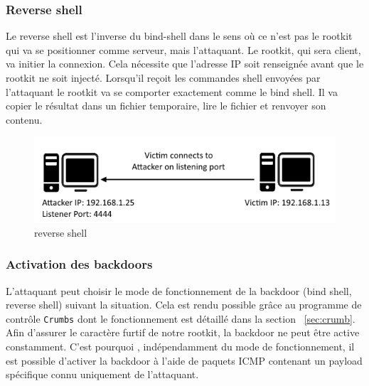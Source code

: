 \documentclass[12pt]{article}
\begin{document}
        \subsubsection{Reverse shell}
            
            Le reverse shell est l'inverse du bind-shell dans le sens où ce n'est pas le rootkit qui va se positionner comme serveur, mais l'attaquant. Le rootkit, qui sera client, va initier la connexion. Cela nécessite que l'adresse IP soit renseignée avant que le rootkit ne soit injecté. Lorsqu'il reçoit les commandes shell envoyées par l'attaquant le rootkit va se comporter exactement comme le bind shell. Il va copier le résultat dans un fichier temporaire, lire le fichier et renvoyer son contenu.
            
\begin{figure}[H] 
\begin{center}
\includegraphics{./img/reverse-shell.png}

\caption[dsfsdf]{reverse shell}
\end{center}
\end{figure}
            
        \subsubsection{Activation des backdoors}
            
            L'attaquant peut choisir le mode de fonctionnement de la backdoor (bind shell, reverse shell) suivant la situation. Cela est rendu possible grâce au programme de contrôle \texttt{Crumbs} dont le fonctionnement est détaillé dans la section ~\ref{sec:crumb}. 
			Afin d'assurer le caractère furtif de notre rootkit, la backdoor ne peut être active constamment. C'est pourquoi , indépendamment du mode de fonctionnement, il est possible d'activer la backdoor à l'aide de paquets ICMP contenant un payload spécifique connu uniquement de l'attaquant.             
            
\end{document}
